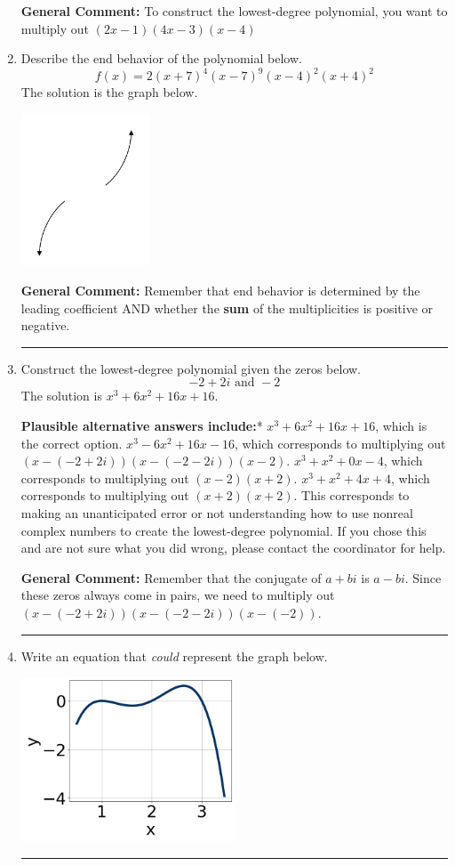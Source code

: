 \documentclass{extbook}[14pt]
\newcommand{\litem}[1]{\item #1

\rule{\textwidth}{0.4pt}}
\begin{document}
\begin{enumerate}
{\textbf{General Comment:} To construct the lowest-degree polynomial, you want to multiply out $(2x -1)(4x -3)(x -4)$
}
\litem{
Describe the end behavior of the polynomial below.
\[ f(x) = 2(x + 7)^{4}(x - 7)^{9}(x - 4)^{2}(x + 4)^{2} \]The solution is the graph below.
    \begin{center}
        \includegraphics[width=0.3\textwidth]{../Figures/polyEndBehaviorCopyDB.png}
    \end{center}

\textbf{General Comment:} Remember that end behavior is determined by the leading coefficient AND whether the \textbf{sum} of the multiplicities is positive or negative.
}
\litem{
Construct the lowest-degree polynomial given the zeros below.
\[ -2 + 2 i \text{ and } -2 \]The solution is \( x^{3} +6 x^{2} +16 x + 16 \).\begin{enumerate}[label=\Alph*.]
\textbf{Plausible alternative answers include:}* $x^{3} +6 x^{2} +16 x + 16$, which is the correct option.
$x^{3} -6 x^{2} +16 x -16$, which corresponds to multiplying out $(x-(-2 + 2 i))(x-(-2 - 2 i))(x -2)$.
$x^{3} + x^{2} +0 x -4$, which corresponds to multiplying out $(x -2)(x + 2)$.
$x^{3} + x^{2} +4 x + 4$, which corresponds to multiplying out $(x + 2)(x + 2)$.
This corresponds to making an unanticipated error or not understanding how to use nonreal complex numbers to create the lowest-degree polynomial. If you chose this and are not sure what you did wrong, please contact the coordinator for help.
\end{enumerate}

\textbf{General Comment:} Remember that the conjugate of $a+bi$ is $a-bi$. Since these zeros always come in pairs, we need to multiply out $(x-(-2 + 2 i))(x-(-2 - 2 i))(x-(-2))$.
}
\litem{
Write an equation that \textit{could} represent the graph below.

\begin{center}
    \includegraphics[width=0.5\textwidth]{../Figures/polyGraphToFunctionCopyB.png}
\end{center}


}
\end{enumerate}
\end{document}
